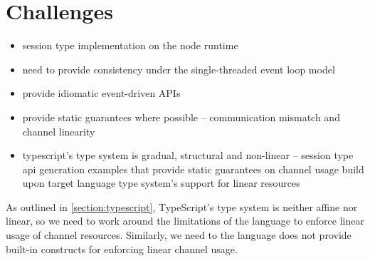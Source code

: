 \section{Challenges}
\label{section:nodechallenges}
\begin{itemize}
\item session type implementation on the node runtime
\item need to provide consistency under the single-threaded event loop model
\item provide idiomatic event-driven APIs
\item provide static guarantees where possible -- communication mismatch and channel linearity
\item typescript's type system is gradual, structural and non-linear -- session type api generation examples that provide static guarantees on channel usage build upon target language type system's support for linear resources
\end{itemize}

As outlined in \cref{section:typescript}, TypeScript's type system
is neither affine nor linear, so we need to work around the 
limitations of the language to enforce linear usage of channel resources.
Similarly, we need to 
the language does not provide
built-in constructs for enforcing linear channel usage.
